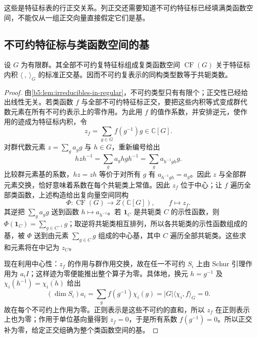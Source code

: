 这些是特征标表的行正交关系。列正交还需要知道不可约特征标已经填满类函数空间，不能仅从一组正交向量直接假定它们是基。

\subsection{不可约特征标与类函数空间的基}
\label{b5:subsec:0202:03}

\begin{theorem}\label{b5:thm:irreducible-character-basis}
	设 \(G\) 为有限群。其全部不可约复特征标组成复类函数空间 \(\operatorname{CF}(G)\) 关于特征标内积 \(\langle\ ,\ \rangle_G\) 的标准正交基。因而不可约复表示的同构类型数等于共轭类数。
\end{theorem}
\begin{proof}
	由\cref{b5:lem:irreducibles-in-regular}，不可约类型只有有限个；正交性已经给出线性无关。若类函数 \(f\) 与全部不可约特征标正交，要把这些内积等式变成群代数元素在所有不可约表示上的零作用。为此用 \(f\) 的值作系数，并安排逆元，使作用的迹成为特征标内积，令
	\[
		z_f=\sum_{g\in G}f(g^{-1})g\in\mathbb C[G].
	\]
	对群代数元素 \(z=\sum_g a_gg\) 与 \(h\in G\)，重新编号给出
	\[
		hzh^{-1}=\sum_g a_g hgh^{-1}=\sum_g a_{h^{-1}gh}g.
	\]
	比较群元素基的系数，\(hz=zh\) 等价于对所有 \(g\) 有 \(a_{h^{-1}gh}=a_g\)。因此 \(z\) 与全部群元素交换，恰好意味着系数在每个共轭类上常值。因此 \(z_f\) 位于中心；让 \(f\) 遍历全部类函数，上述构造给出复向量空间同构
	\[
		\Phi:\operatorname{CF}(G)\longrightarrow Z(\mathbb C[G]),\qquad f\longmapsto z_f.
	\]
	其逆把 \(\sum_g a_gg\) 送到函数 \(h\mapsto a_{h^{-1}}\)。若 \(\mathbf1_C\) 是共轭类 \(C\) 的示性函数，则 \(\Phi(\mathbf1_C)=\sum_{g\in C^{-1}}g\)；取逆将共轭类相互排列，所以各共轭类的示性函数组成的基，被 \(\Phi\) 送到由元素 \(\sum_{g\in C}g\) 组成的中心基，其中 \(C\) 遍历全部共轭类。这些求和元素将在中记为 \(z_C\)。

	现在利用中心性：\(z_f\) 的作用与群作用交换，故在任一不可约 \(S_i\) 上由 Schur 引理作用为 \(a_iI\)；这样迹为零便能推出整个算子为零。具体地，换元 \(h=g^{-1}\) 及 \(\chi_i(h^{-1})=\overline{\chi_i(h)}\) 给出
	\[
		(\dim S_i)a_i=\sum_g f(g^{-1})\chi_i(g) =|G|\langle\chi_i,f\rangle_G=0.
	\]
	故在每个不可约上作用为零。正则表示是这些不可约的直和，所以 \(z_f\) 在正则表示上也为零；作用于单位基向量得到 \(z_f=0\)，于是所有系数 \(f(g^{-1})=0\)。所以正交补为零，给定正交组确为整个类函数空间的基。
\end{proof}

